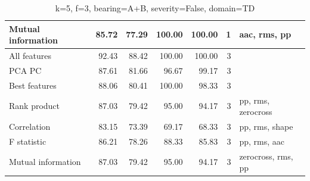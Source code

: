 \begin{table}[]
\begin{tabular}{|l|rr|rr|r|l|}
Mutual information                    & \multicolumn{1}{r|}{85.72}          & 77.29                              & \multicolumn{1}{r|}{100.00}         & 100.00                             & 1                                                   & aac, rms, pp                            \\ \hline
All features                          & \multicolumn{1}{r|}{92.43}          & 88.42                              & \multicolumn{1}{r|}{100.00}         & 100.00                             & 3                                                   &                                         \\ \hline
PCA PC                                & \multicolumn{1}{r|}{87.61}          & 81.66                              & \multicolumn{1}{r|}{96.67}          & 99.17                              & 3                                                   &                                         \\ \hline
Best features                         & \multicolumn{1}{r|}{88.06}          & 80.41                              & \multicolumn{1}{r|}{100.00}         & 98.33                              & 3                                                   &                                         \\ \hline
Rank product                          & \multicolumn{1}{r|}{87.03}          & 79.42                              & \multicolumn{1}{r|}{95.00}          & 94.17                              & 3                                                   & pp, rms, zerocross                      \\ \hline
Correlation                           & \multicolumn{1}{r|}{83.15}          & 73.39                              & \multicolumn{1}{r|}{69.17}          & 68.33                              & 3                                                   & pp, rms, shape                          \\ \hline
F statistic                           & \multicolumn{1}{r|}{86.21}          & 78.26                              & \multicolumn{1}{r|}{88.33}          & 85.83                              & 3                                                   & pp, rms, aac                            \\ \hline
Mutual information                    & \multicolumn{1}{r|}{87.03}          & 79.42                              & \multicolumn{1}{r|}{95.00}          & 94.17                              & 3                                                   & zerocross, rms, pp                      \\ \hline
\end{tabular}
\caption{k=5, f=3, bearing=A+B, severity=False, domain=TD}
\end{table}


